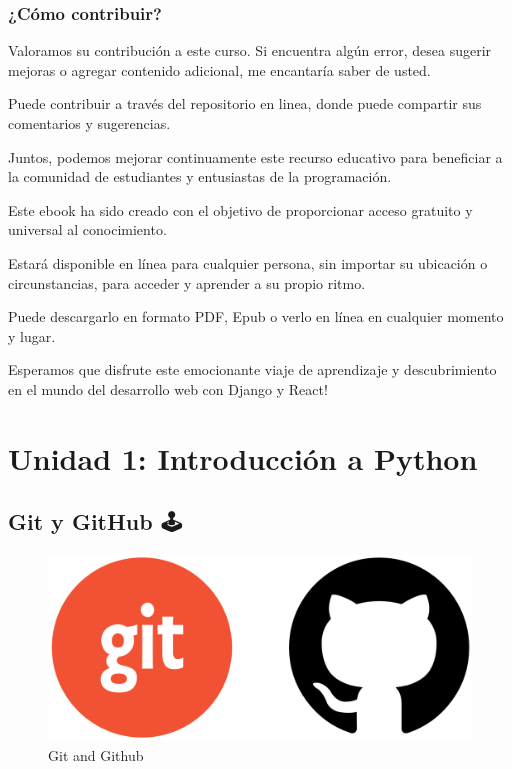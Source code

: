 \documentclass[
  a4paper,
  DIV=11,
  numbers=noendperiod,
  onepage,
  openany]{scrreprt}
\begin{document}
\section{¿Cómo contribuir?}\label{cuxf3mo-contribuir}

Valoramos su contribución a este curso. Si encuentra algún error, desea
sugerir mejoras o agregar contenido adicional, me encantaría saber de
usted.

Puede contribuir a través del repositorio en linea, donde puede
compartir sus comentarios y sugerencias.

Juntos, podemos mejorar continuamente este recurso educativo para
beneficiar a la comunidad de estudiantes y entusiastas de la
programación.

Este ebook ha sido creado con el objetivo de proporcionar acceso
gratuito y universal al conocimiento.

Estará disponible en línea para cualquier persona, sin importar su
ubicación o circunstancias, para acceder y aprender a su propio ritmo.

Puede descargarlo en formato PDF, Epub o verlo en línea en cualquier
momento y lugar.

Esperamos que disfrute este emocionante viaje de aprendizaje y
descubrimiento en el mundo del desarrollo web con Django y React!

\part{Unidad 1: Introducción a Python}

\chapter{Git y GitHub 🕹️}\label{git-y-github}

\begin{figure}[H]

{\centering \includegraphics[width=6.25in,height=\textheight]{unidades/unidad1/../../images/git_and_github.png}

}

\caption{Git and Github}

\end{figure}%
\end{document}
